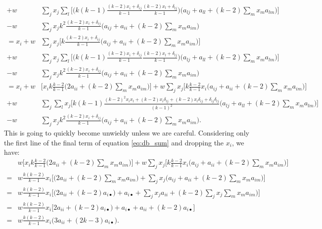 \documentclass[14pt, a4paper, justified]{article}
\begin{document}
\begin{equation}
\begin{split}
        \\
        + w & \sum_j x_j \sum_l \Big[ \Big(k(k-1) \frac{(k-2)x_i + \delta_{ij}}{k-1}\frac{(k-2)x_l + \delta_{lj}}{k-1} \Big) \Big( a_{lj} + a_{ll} + (k-2) \sum_m x_m a_{lm} \Big) \Big]
        \\
        - w & \sum_j x_j k^2 \frac{(k-2)x_i + \delta_{ij}}{k-1} \Big( a_{ij} + a_{ii}+ (k-2) \sum_m x_m a_{im} \Big)
        \\
        = x_i + w & \sum_j x_j \Big[ k \frac{(k-2)x_i + \delta_{ij}}{k-1} \Big( a_{ij} + a_{ii} + (k-2) \sum_m x_m a_{im} \Big) \Big]
        \\
        + w & \sum_j x_j \sum_l \Big[ \Big(k(k-1) \frac{(k-2)x_i + \delta_{ij}}{k-1}\frac{(k-2)x_l + \delta_{lj}}{k-1} \Big) \Big( a_{lj} + a_{ll} + (k-2) \sum_m x_m a_{lm} \Big) \Big]
        \\
        - w & \sum_j x_j k^2 \frac{(k-2)x_i + \delta_{ij}}{k-1} \Big( a_{ij} + a_{ii}+ (k-2) \sum_m x_m a_{im} \Big)
        \\
        = x_i + w & \Big[ x_i k \frac{k-2}{k-1} \Big( 2a_{ii} + (k-2) \sum_m x_m a_{im} \Big) \Big] + w \sum_j x_j \Big[ k\frac{k-2}{k-1} x_i \Big( a_{ij} + a_{ii} + (k-2) \sum_m x_m a_{im} \Big) \Big]
        \\
        + w & \sum_j \sum_l x_j \Big[ k(k-1) \frac{(k-2)^2 x_i x_l + (k-2) x_i \delta_{lj} + (k-2) x_l \delta_{ij} + \delta_{ij}\delta_{lj}}{(k-1)^2} \Big( a_{lj} + a_{ll} + (k-2) \sum_m x_m a_{lm} \Big) \Big]
        \\
        - w & \sum_j x_j k^2 \frac{(k-2)x_i + \delta_{ij}}{k-1} \Big( a_{ij} + a_{ii} + (k-2) \sum_m x_m a_{im} \Big).
    \end{split}
    \label{eq:db_sum}
\end{equation}
This is going to quickly become unwieldy unless we are careful. Considering only the first line of the final term of equation \ref{eq:db_sum} and dropping the $x_i$, we have:
\begin{equation}
    \begin{split}
        & w \Big[ x_i k \frac{k-2}{k-1} \Big( 2a_{ii} + (k-2) \sum_m x_m a_{im} \Big) \Big] + w \sum_j x_j \Big[ k\frac{k-2}{k-1} x_i \Big( a_{ij} + a_{ii} + (k-2) \sum_m x_m a_{im} \Big) \Big]
        \\
        = & w \frac{k(k-2)}{k-1} x_i \Big[ \Big(2 a_{ii} + (k-2) \sum_m x_m a_{im} \Big) + \sum_j x_j \Big( a_{ij} + a_{ii} + (k-2) \sum_m x_m a_{im} \Big) \Big]
        \\
        = & w \frac{k(k-2)}{k-1} x_i \Big[ \Big(2 a_{ii} + (k-2) a_{i \bullet} \Big) + a_{i \bullet} + \sum_j x_j a_{ii} + (k-2) \sum_j x_j \sum_m x_m a_{im} \Big) \Big]
        \\
        = & w \frac{k(k-2)}{k-1} x_i \Big[ 2 a_{ii} + (k-2) a_{i \bullet} \Big) + a_{i \bullet} + a_{ii} + (k-2) a_{i \bullet} \Big]
        \\
        = & w \frac{k(k-2)}{k-1} x_i \Big( 3 a_{ii} + (2k-3) a_{i \bullet} \Big).
    \end{split}
\end{equation}
\end{document}
